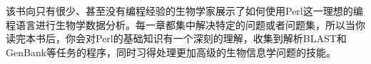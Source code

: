 该书向只有很少、甚至没有编程经验的生物学家展示了如何使用Perl这一理想的编程语言进行生物学数据分析。每一章都集中解决特定的问题或者问题集，所以当你读完本书后，你会对Perl的基础知识有一个深刻的理解，收集到解析BLAST和GenBank等任务的程序，同时习得处理更加高级的生物信息学问题的技能。
